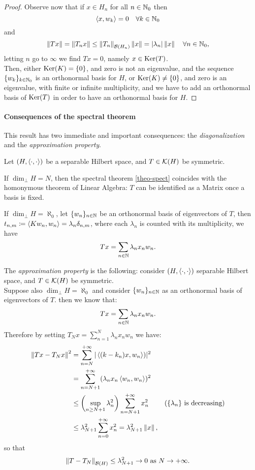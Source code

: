 \begin{proof}
	Observe now that if $x \in H_n$ for all $n \in \mathbb N_0$ then 
	$$
		\left\langle x, w_k\right\rangle
		= 0
		\quad \forall k \in \mathbb N_0
	$$
	and
	$$ 
		\left\lVert Tx\right\rVert 
		= \left\lVert T_nx\right\rVert 
		\leq \left\lVert T_n\right\rVert_{\mathcal B(H_n)}\left\lVert x\right\rVert
		= \left\lvert\lambda_n\right\rvert\left\lVert x\right\rVert
		\quad \forall n \in \mathbb N_0
		,
	$$
	letting $n$ go to $\infty$ we find $Tx=0$, namely $x \in \operatorname{Ker}(T)$.\\
	
	Then, either $\operatorname{Ker}(K) = \{0\}$, and zero is not an eigenvalue, and the sequence $\{w_k\}_{k \in \mathbb N_0}$ is an orthonormal basis for $H$, or $\operatorname{Ker}(K) \neq \{0\}$, and zero is an eigenvalue, with finite or infinite multiplicity, and we have to add an orthonormal basis of $\operatorname{Ker}(T)$ in order to have an orthonormal basis for $H$.
\end{proof}

\paragraph{Consequences of the spectral theorem} This result has two immediate and important consequences: the \emph{diagonalization} and the \emph{approximation property}. \\

\begin{prop}[diagonalization]
	Let $(H,\left\langle\cdot, \cdot\right\rangle )$ be a separable Hilbert space, and $T \in \mathcal K(H)$ be symmetric.
	
	If $\dim_\perp H = N$, then the spectral theorem \vref{theo-spect} coincides with the homonymous theorem of Linear Algebra: $T$ can be identified as a Matrix once a basis is fixed.
	
	If $\dim_\perp H = \aleph_0$, let $\{w_n\}_{n \in \mathbb N}$ be an orthonormal basis of eigenvectors of $T$, then $t_{n,m} \coloneqq \left\langle K w_n, w_n\right\rangle = \lambda_n \delta_{n,m}$, where each $\lambda_n$ is counted with its multiplicity, we have
	$$
		Tx 
		= \sum_{n\in\mathbb N} \lambda_n x_n w_n
		.
	$$
\end{prop}

The \emph{approximation property}  is the following: consider $(H,\left\langle\cdot, \cdot\right\rangle )$ separable Hilbert space, and $T \in \mathcal K(H)$ be symmetric.\\
Suppose also $\dim_\perp H = \aleph_0$ and consider $\{w_n\}_{n \in \mathbb N}$ as an orthonormal basis of eigenvectors of $T$. then we know that: 
$$
	Tx 
	= \sum_{n\in\mathbb N} \lambda_n x_n w_n
	.
$$
Therefore by setting $T_N x = \sum_{n=1}^N \lambda_n x_n w_n$ we have:
\begin{align*}
	\left\lVert Tx-T_N x\right\rVert^2
	&= \sum_{n=N}^{+\infty} |\left\langle(k-k_n)x, w_n\right\rangle)|^2 \\
	&= \sum_{n=N+1}^{+\infty} (\lambda_n x_n \left\langle w_n, w_n\right\rangle)^2 \\
	&\le \left( \sup_{n \ge N + 1} \lambda_n^2 \right) \sum_{n=N+1}^{+\infty} x_n^2
	& \text{($\{\lambda_n\}$ is decreasing)} \\
	&\le \lambda_{N+1}^2 \sum_{n=0}^{+\infty} x_n^2
	=\lambda_{N+1}^2 \left\lVert x\right\rVert,
\end{align*}
so that
$$ 
	\left\lVert T-T_N\right\rVert_{\mathcal B(H)} 
	\leq \lambda_{N+1}^2 
	\to 0
	\text{ as } N \to +\infty
	.
$$

